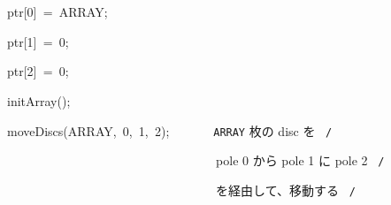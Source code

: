 \documentclass{article}
\begin{document}
\noindent
\mbox{}\hfill

\noindent
\mbox{}\hfill

\noindent
\mbox{}ptr[0]{\tt\mc \ }={\tt\mc \ }ARRAY;

\noindent
\mbox{}ptr[1]{\tt\mc \ }={\tt\mc \ }0;

\noindent
\mbox{}ptr[2]{\tt\mc \ }={\tt\mc \ }0;

\noindent
\mbox{}\hfill

\noindent
\mbox{}initArray();

\noindent
\mbox{}moveDiscs(ARRAY,{\tt\mc \ }0,{\tt\mc \ }1,{\tt\mc \ }2);{\tt\mc \ \ \ \ \ \ }\rm\mc {\tt /}{\tt *}\  {}{\tt ARRAY} 枚の disc を \hfill \rm\mc \ {\tt *}{\tt /}
\tt\mc 

\noindent
\mbox{}{\tt\mc \ \ \ \ \ \ \ \ \ \ \ \ \ \ \ \ \ \ \ \ \ \ \ \ \ \ \ \ \ \ \ \ }\rm\mc {\tt /}{\tt *}\  {}pole 0 から pole 1 に pole 2 \hfill \rm\mc \ {\tt *}{\tt /}
\tt\mc 

\noindent
\mbox{}{\tt\mc \ \ \ \ \ \ \ \ \ \ \ \ \ \ \ \ \ \ \ \ \ \ \ \ \ \ \ \ \ \ \ \ }\rm\mc {\tt /}{\tt *}\  {}を経由して、移動する \hfill \rm\mc \ {\tt *}{\tt /}
\tt\mc 

\noindent
\mbox{}

\rm\mc
\end{document}
